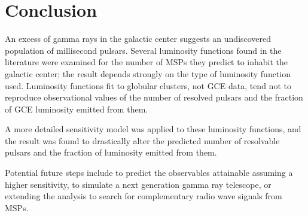 \documentclass{C://Aliases//Dropbox-MIT//Latex_Templates//personal}
\begin{document}
\section{Conclusion}
An excess of gamma rays in the galactic center suggests an undiscovered population of millisecond pulsars. Several luminosity functions found in the literature were examined for the number of MSPs they predict to inhabit the galactic center; the result depends strongly on the type of luminosity function used. Luminosity functions fit to globular clusters, not GCE data, tend not to reproduce observational values of the number of resolved pulsars and the fraction of GCE luminosity emitted from them.

A more detailed sensitivity model was applied to these luminosity functions, and the result was found to drastically alter the predicted number of resolvable pulsars and the fraction of luminosity emitted from them.

Potential future steps include to predict the observables attainable assuming a higher sensitivity, to simulate a next generation gamma ray telescope, or extending the analysis to search for complementary radio wave signals from MSPs. 


\printbibliography
\end{document}
